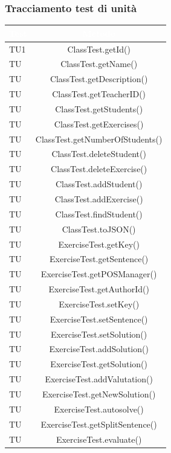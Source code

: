 \subsubsection{Tracciamento test di unità}
\begin{longtable}{|>{\centering\arraybackslash}m{1.6cm}|c|}		
 	\rowcolor{LightBlue}
		\textbf{\textcolor{white}{Test}}
		& \textbf{\textcolor{white}{Metodo}}\\		\hline
		TU1 & ClassTest.getId()\\ \hline
		TU & ClassTest.getName()\\ \hline
		TU & ClassTest.getDescription()\\ \hline
		TU & ClassTest.getTeacherID()\\ \hline
		TU & ClassTest.getStudents()\\ \hline
		TU & ClassTest.getExercises()\\ \hline
		TU & ClassTest.getNumberOfStudents()\\ \hline
		TU & ClassTest.deleteStudent()\\ \hline
		TU & ClassTest.deleteExercise()\\ \hline
		TU & ClassTest.addStudent()\\ \hline
		TU & ClassTest.addExercise()\\ \hline
		TU & ClassTest.findStudent()\\ \hline
		TU & ClassTest.toJSON()\\ \hline
		TU & ExerciseTest.getKey()\\ \hline
		TU & ExerciseTest.getSentence()\\ \hline
		TU & ExerciseTest.getPOSManager()\\ \hline
		TU & ExerciseTest.getAuthorId()\\ \hline
		TU & ExerciseTest.setKey()\\ \hline
		TU & ExerciseTest.setSentence()\\ \hline
		TU & ExerciseTest.setSolution()\\ \hline
		TU & ExerciseTest.addSolution()\\ \hline
		TU & ExerciseTest.getSolution()\\ \hline
		TU & ExerciseTest.addValutation()\\ \hline
		TU & ExerciseTest.getNewSolution()\\ \hline
		TU & ExerciseTest.autosolve()\\ \hline
		TU & ExerciseTest.getSplitSentence()\\ \hline
		TU & ExerciseTest.evaluate()\\ \hline

\end{longtable}
